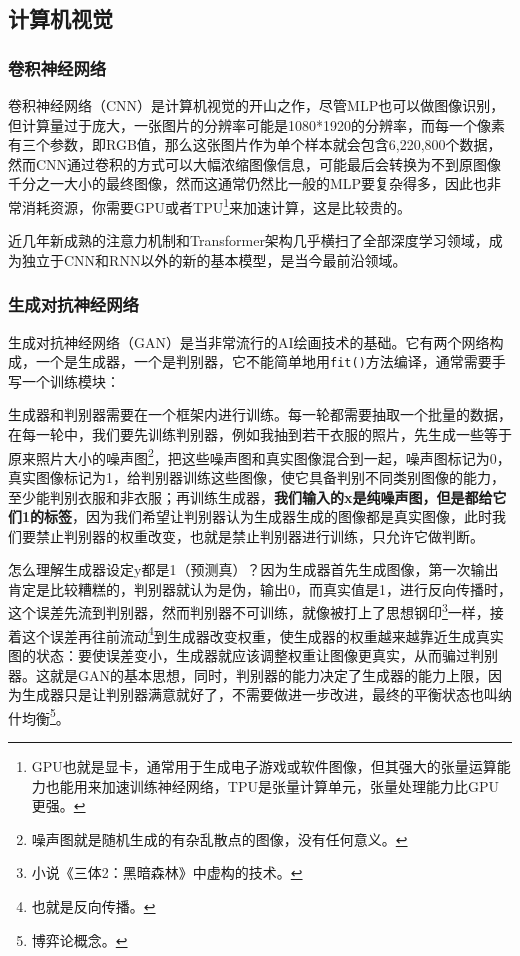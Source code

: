 \documentclass[a5paper, 11pt]{ctexbook}
\begin{document}
\subsection{计算机视觉}

\subsubsection{卷积神经网络}
卷积神经网络（CNN）是计算机视觉的开山之作，尽管MLP也可以做图像识别，但计算量过于庞大，一张图片的分辨率可能是1080*1920的分辨率，而每一个像素有三个参数，即RGB值，那么这张图片作为单个样本就会包含6,220,800个数据，然而CNN通过卷积的方式可以大幅浓缩图像信息，可能最后会转换为不到原图像千分之一大小的最终图像，然而这通常仍然比一般的MLP要复杂得多，因此也非常消耗资源，你需要GPU或者TPU\footnote{GPU也就是显卡，通常用于生成电子游戏或软件图像，但其强大的张量运算能力也能用来加速训练神经网络，TPU是张量计算单元，张量处理能力比GPU更强。}来加速计算，这是比较贵的。

近几年新成熟的注意力机制和Transformer架构几乎横扫了全部深度学习领域，成为独立于CNN和RNN以外的新的基本模型，是当今最前沿领域。

\subsubsection{生成对抗神经网络}
生成对抗神经网络（GAN）是当非常流行的AI绘画技术的基础。它有两个网络构成，一个是生成器，一个是判别器，它不能简单地用\verb|fit()|方法编译，通常需要手写一个训练模块：

生成器和判别器需要在一个框架内进行训练。每一轮都需要抽取一个批量的数据，在每一轮中，我们要先训练判别器，例如我抽到若干衣服的照片，先生成一些等于原来照片大小的噪声图\footnote{噪声图就是随机生成的有杂乱散点的图像，没有任何意义。}，把这些噪声图和真实图像混合到一起，噪声图标记为0，真实图像标记为1，给判别器训练这些图像，使它具备判别不同类别图像的能力，至少能判别衣服和非衣服；再训练生成器，\textbf{我们输入的x是纯噪声图，但是都给它们1的标签}，因为我们希望让判别器认为生成器生成的图像都是真实图像，此时我们要禁止判别器的权重改变，也就是禁止判别器进行训练，只允许它做判断。

怎么理解生成器设定y都是1（预测真）？因为生成器首先生成图像，第一次输出肯定是比较糟糕的，判别器就认为是伪，输出0，而真实值是1，进行反向传播时，这个误差先流到判别器，然而判别器不可训练，就像被打上了思想钢印\footnote{小说《三体2：黑暗森林》中虚构的技术。}一样，接着这个误差再往前流动\footnote{也就是反向传播。}到生成器改变权重，使生成器的权重越来越靠近生成真实图的状态：要使误差变小，生成器就应该调整权重让图像更真实，从而骗过判别器。这就是GAN的基本思想，同时，判别器的能力决定了生成器的能力上限，因为生成器只是让判别器满意就好了，不需要做进一步改进，最终的平衡状态也叫纳什均衡\footnote{博弈论概念。}。
\end{document}
